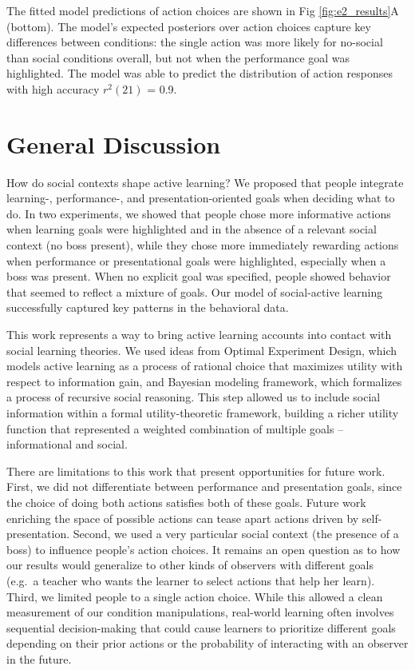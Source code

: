 \documentclass[10pt, letterpaper]{article}
\begin{document}
The fitted model predictions of action choices are shown in Fig
\ref{fig:e2_results}A (bottom). The model's expected posteriors over
action choices capture key differences between conditions: the single
action was more likely for no-social than social conditions overall, but
not when the performance goal was highlighted. The model was able to
predict the distribution of action responses with high accuracy
\(r^2(21)\) = 0.9.

\section{General Discussion}\label{general-discussion}

How do social contexts shape active learning? We proposed that people
integrate learning-, performance-, and presentation-oriented goals when
deciding what to do. In two experiments, we showed that people chose
more informative actions when learning goals were highlighted and in the
absence of a relevant social context (no boss present), while they chose
more immediately rewarding actions when performance or presentational
goals were highlighted, especially when a boss was present. When no
explicit goal was specified, people showed behavior that seemed to
reflect a mixture of goals. Our model of social-active learning
successfully captured key patterns in the behavioral data.

This work represents a way to bring active learning accounts into
contact with social learning theories. We used ideas from Optimal
Experiment Design, which models active learning as a process of rational
choice that maximizes utility with respect to information gain, and
Bayesian modeling framework, which formalizes a process of recursive
social reasoning. This step allowed us to include social information
within a formal utility-theoretic framework, building a richer utility
function that represented a weighted combination of multiple goals --
informational and social.

There are limitations to this work that present opportunities for future
work. First, we did not differentiate between performance and
presentation goals, since the choice of doing both actions satisfies
both of these goals. Future work enriching the space of possible actions
can tease apart actions driven by self-presentation. Second, we used a
very particular social context (the presence of a boss) to influence
people's action choices. It remains an open question as to how our
results would generalize to other kinds of observers with different
goals (e.g.~a teacher who wants the learner to select actions that help
her learn). Third, we limited people to a single action choice. While
this allowed a clean measurement of our condition manipulations,
real-world learning often involves sequential decision-making that could
cause learners to prioritize different goals depending on their prior
actions or the probability of interacting with an observer in the
future.
\end{document}
